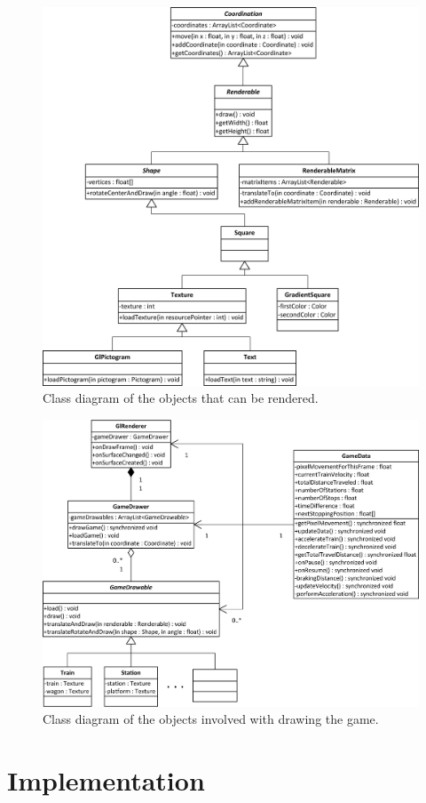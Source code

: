 \begin{figure}[H]
\centering
\includegraphics[width=0.9\linewidth]{img/renderables.png}%
\caption{Class diagram of the objects that can be rendered.}
\label{fig:renderables}
\end{figure}


\begin{figure}[H]
\centering
\includegraphics[width=0.9\linewidth]{img/game.png}%
\caption{Class diagram of the objects involved with drawing the game.}
\label{fig:game}
\end{figure}

\section{Implementation}

